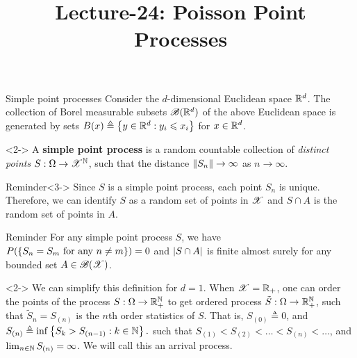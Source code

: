 \documentclass[12pt,aspectratio=169]{beamer}
\title{Lecture-24: Poisson Point Processes}
\date{}
\begin{document}
\pagestyle{empty}
\maketitle



\begin{frame}{Simple point processes} 
Consider the $d$-dimensional Euclidean space $\mathbb{R}^d$. 
The collection of Borel measurable subsets $\mathscr{B}(\mathbb{R}^d)$ of the above Euclidean space is generated by sets $B(x) \triangleq \left\{y \in \mathbb{R}^d: y_i \leqslant x_i\right\}$ for $x \in \mathbb{R}^d$.  
\begin{Definition}<2->
A \textbf{simple point process} is a random countable collection of \emph{distinct points} $S: \Omega \to \mathscr{X}^{\mathbb{N}}$, 
such that the distance $\left\lVert S_n\right\rVert \to \infty$ as $n \to \infty$. 
\end{Definition}
\begin{block}{Reminder}<3->
Since $S$ is a simple point process, each point $S_n$ is unique. 
Therefore, we can identify $S$ as a random set of points in $\mathscr{X}$ and $S\cap A$ is the random set of points in $A$. 
\end{block}
\end{frame}

\begin{frame}
\begin{block}{Reminder}
For any simple point process $S$, we have $P(\left\{S_n = S_m \text{ for any } n \neq m\right\}) = 0$ and $\left\lvert S\cap A\right\rvert$ is finite almost surely for any bounded set $A \in \mathscr{B}(\mathscr{X})$.
\end{block}

\begin{Example}<2->
We can simplify this definition for $d=1$. 
When $\mathscr{X} = \mathbb{R}_+$, one can order the points of the process $S: \Omega \to \mathbb{R}_+^{\mathbb{N}}$ to get ordered process $\tilde{S}: \Omega \to \mathbb{R}_+^{\mathbb{N}}$, 
such that $\tilde{S}_n = S_{(n)}$ is the $n$th order statistics of $S$. 
That is, $S_{(0)} \triangleq 0$, 
and 
$
S_{(n)} \triangleq \inf\left\{S_k > S_{(n-1)}: k \in \mathbb{N}\right\}. 
$ 
such that $S_{(1)} < S_{(2)} < \dots < S_{(n)} < \dots$, and $\lim_{n \in \mathbb{N}}S_{(n)} = \infty$. 
We will call this an arrival process. 
\end{Example}
\end{frame}
\end{document}
